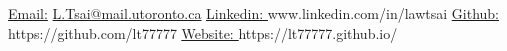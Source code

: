 \documentclass[UTF8]{resume} %
\begin{document}
  \scriptsize\underline{Email:}
            \href{L.Tsai@mail.utoronto.ca}{L.Tsai@mail.utoronto.ca}     {  }
            \href{https://www.linkedin.com/in/lawtsai}{\scriptsize\underline{Linkedin: }}{www.linkedin.com/in/lawtsai}
            {        }
           \href{https://github.com/lt77777}{\scriptsize\underline{Github: }}{https://github.com/lt77777}
           {        }
           \href{https://lt77777.github.io/}{\scriptsize\underline{Website: }}{https://lt77777.github.io/}\\
~\vspace{-0.7cm}
\end{document}
